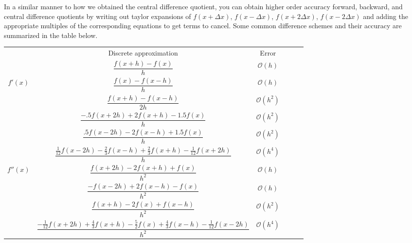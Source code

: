 \documentclass[]{article}
\theoremstyle{definition}
\numberwithin{equation}{section}
\begin{document}
	In a similar manner to how we obtained the central difference quotient, you can obtain higher order accuracy forward, backward, and central difference quotients by writing out taylor expansions of $f(x+\Delta x)$, $f(x-\Delta x)$, $f(x+2\Delta x)$, $f(x-2\Delta x)$ and adding the appropriate multiples of the corresponding equations to get terms to cancel. Some common difference schemes and their accuracy are summarized in the table below.
	\begin{center}
		\begin{tabular}{Sc|Sc|Sc|} 
			& Discrete approximation & Error \\
			 &  $\dfrac{f(x+h) - f(x)}{h}$ & $\mathcal{O}(h)$ \\ 
			 & $\dfrac{f(x) - f(x-h)}{h}$ &  $\mathcal{O}(h)$ \\ 
			 & $\dfrac{f(x+h) - f(x-h)}{2h}$ &  $\mathcal{O}(h^2)$ \\ 
			 & $\dfrac{-.5f(x+2h)+2f(x+h) - 1.5f(x)}{h}$ & $\mathcal{O}(h^2)$ \\ 
			 & $\dfrac{.5f(x-2h)-2f(x-h) + 1.5f(x)}{h}$ & $\mathcal{O}(h^2)$ \\ 
			 & $\dfrac{\frac{1}{12}f(x-2h) - \frac{2}{3} f(x-h) + \frac{2}{3}f(x+h) - \frac{1}{12}f(x+2h)}{h}$ & $\mathcal{O}(h^4)$ \\ 
			 & $\dfrac{f(x+2h)-2f(x+h)+f(x)}{h^2}$ &  $\mathcal{O}(h)$ \\ 
			 & $\dfrac{-f(x-2h)+2f(x-h)-f(x)}{h^2}$ &  $\mathcal{O}(h)$ \\ 
			 & $\dfrac{f(x+h) - 2f(x) + f(x-h)}{h^2}$ &  $\mathcal{O}(h^2)$ \\ 
			 & $\dfrac{-\frac{1}{12}f(x+2h) + \frac{4}{3}f(x+h)-\frac{5}{2}f(x) + \frac{4}{3}f(x-h) - \frac{1}{12}f(x-2h)}{h^2}$ &  $\mathcal{O}(h^4)$ \\ 
		\end{tabular}
	\end{center}
	
\end{document}
